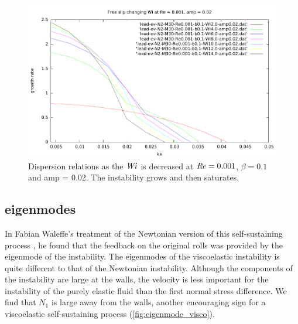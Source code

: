 \documentclass{jfm}
\newcommand\Wi{\mbox{\textit{Wi}}}
\newcommand\Rey{\mbox{\textit{Re}}}  %
\begin{document}
\begin{figure}
    \centering
    \includegraphics[width=\textwidth]{./figures/dispersions_varyWi}
    \caption{Dispersion relations as the $\Wi$ is decreased at $\Rey = 0.001$, $\beta=0.1$ and amp = 0.02. The instability grows and then saturates.}
    \label{fig:dispersions_varyWi}
\end{figure}

\subsection{eigenmodes}

In Fabian Waleffe's treatment of the Newtonian version of this self-sustaining process \cite{Waleffe1997}, he found that the feedback on the original rolls was provided by the eigenmode of the instability. The eigenmodes of the viscoelastic instability is quite different to that of the Newtonian instability. Although the components of the instability are large at the walls, the velocity is less important for the instability of the purely elastic fluid than the first normal stress difference. We find that $N_{1}$ is large away from the walls, another encouraging sign for a viscoelastic self-sustaining process (\ref{fig:eigenmode_visco}).
\end{document}
